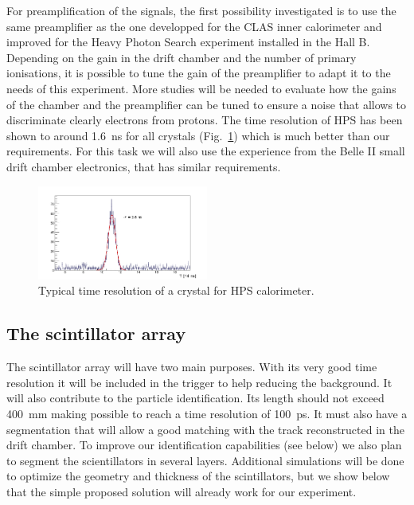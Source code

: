 For preamplification of the signals, the first possibility investigated is to use the same preamplifier as the one developped for the CLAS inner calorimeter and improved for the Heavy Photon Search \cite{HPS} experiment installed in the Hall B. Depending on the gain in the drift chamber and the number of primary ionisations, it is possible to tune the gain of the preamplifier to adapt it to the needs of this experiment. More studies will be needed to evaluate how the gains of the chamber and the preamplifier can be tuned to ensure a noise that allows to discriminate clearly electrons from protons. The time resolution of HPS has been shown to around 1.6~ns for all crystals (Fig.~\ref{fig:HPSTreso}) which is much better than our requirements. For this task we will also use the experience from the Belle II small drift chamber electronics, that has similar requirements.

\begin{figure}
  \begin{center}
    \includegraphics[angle=0, width=0.5\textwidth]{./../Detector/fig-chap2/timing_fit_gauss_3pol}
    \caption{Typical time resolution of a crystal for HPS calorimeter.}
    \label{fig:HPSTreso}
  \end{center}
\end{figure}

\subsection{The scintillator array}

The scintillator array will have two main purposes. With its very good time resolution it will be included in the trigger to help reducing the background. It will also contribute to the particle identification. Its length should not exceed 400~mm making possible to reach a time resolution of 100~ps. It must also have a segmentation that will allow a good matching with the track reconstructed in the drift chamber. To improve our identification capabilities (see below) we also plan to segment the scientillators in several layers. Additional simulations will be done to optimize the geometry and thickness of the scintillators, but we show below that the simple proposed solution will already work for our experiment.

